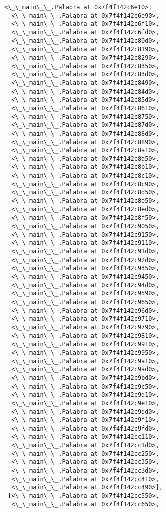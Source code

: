 \documentclass[12pt,a4paper,table]{article}
\begin{document}
\begin{tcolorbox}[breakable, size=fbox, boxrule=.5pt, pad at break*=1mm, opacityfill=0]
\begin{Verbatim}[commandchars=\\\{\}]
  <\_\_main\_\_.Palabra at 0x7f4f142c6e10>,
  <\_\_main\_\_.Palabra at 0x7f4f142c6e90>,
  <\_\_main\_\_.Palabra at 0x7f4f142c6f10>,
  <\_\_main\_\_.Palabra at 0x7f4f142c6fd0>,
  <\_\_main\_\_.Palabra at 0x7f4f142c80d0>,
  <\_\_main\_\_.Palabra at 0x7f4f142c8190>,
  <\_\_main\_\_.Palabra at 0x7f4f142c8290>,
  <\_\_main\_\_.Palabra at 0x7f4f142c8350>,
  <\_\_main\_\_.Palabra at 0x7f4f142c83d0>,
  <\_\_main\_\_.Palabra at 0x7f4f142c8490>,
  <\_\_main\_\_.Palabra at 0x7f4f142c84d0>,
  <\_\_main\_\_.Palabra at 0x7f4f142c85d0>,
  <\_\_main\_\_.Palabra at 0x7f4f142c8610>,
  <\_\_main\_\_.Palabra at 0x7f4f142c8750>,
  <\_\_main\_\_.Palabra at 0x7f4f142c87d0>,
  <\_\_main\_\_.Palabra at 0x7f4f142c88d0>,
  <\_\_main\_\_.Palabra at 0x7f4f142c8890>,
  <\_\_main\_\_.Palabra at 0x7f4f142c8a10>,
  <\_\_main\_\_.Palabra at 0x7f4f142c8a50>,
  <\_\_main\_\_.Palabra at 0x7f4f142c8b10>,
  <\_\_main\_\_.Palabra at 0x7f4f142c8c10>,
  <\_\_main\_\_.Palabra at 0x7f4f142c8c90>,
  <\_\_main\_\_.Palabra at 0x7f4f142c8d50>,
  <\_\_main\_\_.Palabra at 0x7f4f142c8e50>,
  <\_\_main\_\_.Palabra at 0x7f4f142c8ed0>,
  <\_\_main\_\_.Palabra at 0x7f4f142c8f50>,
  <\_\_main\_\_.Palabra at 0x7f4f142c9050>,
  <\_\_main\_\_.Palabra at 0x7f4f142c9150>,
  <\_\_main\_\_.Palabra at 0x7f4f142c9110>,
  <\_\_main\_\_.Palabra at 0x7f4f142c91d0>,
  <\_\_main\_\_.Palabra at 0x7f4f142c92d0>,
  <\_\_main\_\_.Palabra at 0x7f4f142c9350>,
  <\_\_main\_\_.Palabra at 0x7f4f142c9450>,
  <\_\_main\_\_.Palabra at 0x7f4f142c94d0>,
  <\_\_main\_\_.Palabra at 0x7f4f142c9590>,
  <\_\_main\_\_.Palabra at 0x7f4f142c9650>,
  <\_\_main\_\_.Palabra at 0x7f4f142c96d0>,
  <\_\_main\_\_.Palabra at 0x7f4f142c9710>,
  <\_\_main\_\_.Palabra at 0x7f4f142c9790>,
  <\_\_main\_\_.Palabra at 0x7f4f142c9810>,
  <\_\_main\_\_.Palabra at 0x7f4f142c9910>,
  <\_\_main\_\_.Palabra at 0x7f4f142c9950>,
  <\_\_main\_\_.Palabra at 0x7f4f142c9a10>,
  <\_\_main\_\_.Palabra at 0x7f4f142c9ad0>,
  <\_\_main\_\_.Palabra at 0x7f4f142c9bd0>,
  <\_\_main\_\_.Palabra at 0x7f4f142c9c50>,
  <\_\_main\_\_.Palabra at 0x7f4f142c9d10>,
  <\_\_main\_\_.Palabra at 0x7f4f142c9e10>,
  <\_\_main\_\_.Palabra at 0x7f4f142c9dd0>,
  <\_\_main\_\_.Palabra at 0x7f4f142c9f10>,
  <\_\_main\_\_.Palabra at 0x7f4f142c9fd0>,
  <\_\_main\_\_.Palabra at 0x7f4f142cc110>,
  <\_\_main\_\_.Palabra at 0x7f4f142cc1d0>,
  <\_\_main\_\_.Palabra at 0x7f4f142cc250>,
  <\_\_main\_\_.Palabra at 0x7f4f142cc350>,
  <\_\_main\_\_.Palabra at 0x7f4f142cc3d0>,
  <\_\_main\_\_.Palabra at 0x7f4f142cc410>,
  <\_\_main\_\_.Palabra at 0x7f4f142cc490>],
 [<\_\_main\_\_.Palabra at 0x7f4f142cc550>,
  <\_\_main\_\_.Palabra at 0x7f4f142cc650>,

\end{Verbatim}
\end{tcolorbox}
\end{document}
